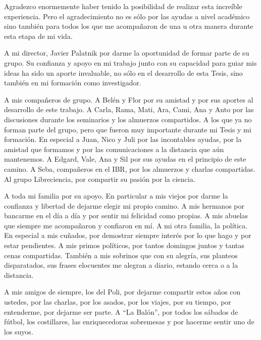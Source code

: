 
\begin{acknowledgements}      

Agradezco enormemente haber tenido la posibilidad de realizar esta increíble experiencia.
Pero el agradecimiento no es sólo por las ayudas a nivel académico sino también para todos los que me acompañaron de una u otra manera durante esta etapa de mi vida.

A mi director, Javier Palatnik por darme la oportunidad de formar parte de su grupo.
Su confianza y apoyo en mi trabajo junto con su capacidad para guiar mis ideas ha sido un aporte invaluable, no sólo en el desarrollo de esta Tesis, sino también en mi formación como investigador.

A mis compañeros de grupo. 
A Belén y Flor por su amistad y por sus aportes al desarrollo de este trabajo.
A Carla, Rama, Mati, Ara, Cami, Ana y Anto por las discusiones durante los seminarios y los almuerzos compartidos.
A los que ya no forman parte del grupo, pero que fueron muy importante durante mi Tesis y mi formación.
En especial a  Juan, Nico y Juli por las incontables ayudas, por la amistad que formamos y por las comunicaciones a la distancia que aún mantenemos.
A Edgard, Vale, Ana y Sil por sus ayudas en el principio de este camino.
A Seba, compañeros en el IBR, por los almuerzos y charlas compartidas.
Al grupo Libreciencia, por compartir su pasión por la ciencia.

A toda mi familia por su apoyo.
En particular a mis viejos por darme la confianza y libertad de dejarme elegir mi propio camino. 
A mis hermanos por bancarme en el día a día y por sentir mi felicidad como propias.
A mis abuelas que siempre me acompañaron y confiaron en mí.
A mi otra familia, la política. 
En especial a mis cuñados, por demostrar siempre interés por lo que hago y por estar pendientes.
A mis primos políticos, por tantos domingos juntos y tantas cenas compartidas.
También a mis sobrinos que con su alegría, sus planteos disparatados, sus frases elocuentes me alegran a diario, estando cerca o a la distancia.

A mis amigos de siempre, los del Poli, por dejarme compartir estos años con ustedes, por las charlas, por los asados, por los viajes, por su tiempo, por entenderme, por dejarme ser parte.
A ``La Balón'', por todos los sábados de fútbol, los costillares, las enriquecedoras sobremesas y por hacerme sentir uno de los suyos.


\end{acknowledgements}
